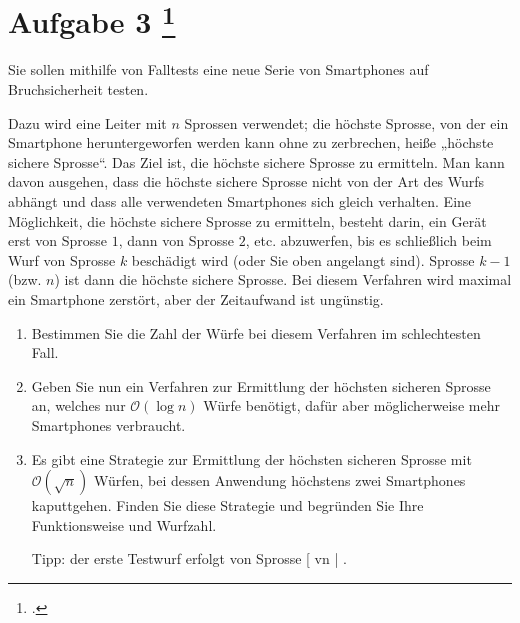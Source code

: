 \documentclass{lehramt-informatik-aufgabe}
\begin{document}
\section{Aufgabe 3
\footcite{46116:2016:03}}

Sie sollen mithilfe von Falltests eine neue Serie von Smartphones auf
Bruchsicherheit testen.

Dazu wird eine Leiter mit $n$ Sprossen verwendet; die höchste Sprosse,
von der ein Smartphone heruntergeworfen werden kann ohne zu zerbrechen,
heiße „höchste sichere Sprosse“. Das Ziel ist, die höchste sichere
Sprosse zu ermitteln. Man kann davon ausgehen, dass die höchste sichere
Sprosse nicht von der Art des Wurfs abhängt und dass alle verwendeten
Smartphones sich gleich verhalten. Eine Möglichkeit, die höchste sichere
Sprosse zu ermitteln, besteht darin, ein Gerät erst von Sprosse $1$,
dann von Sprosse $2$, etc. abzuwerfen, bis es schließlich beim Wurf von
Sprosse $k$ beschädigt wird (oder Sie oben angelangt sind). Sprosse $k -
1$ (bzw. $n$) ist dann die höchste sichere Sprosse. Bei diesem Verfahren
wird maximal ein Smartphone zerstört, aber der Zeitaufwand ist
ungünstig.

\begin{enumerate}

\item Bestimmen Sie die Zahl der Würfe bei diesem Verfahren im
schlechtesten Fall.

\item Geben Sie nun ein Verfahren zur Ermittlung der höchsten sicheren
Sprosse an, welches nur $\mathcal{O} (\log n)$ Würfe benötigt, dafür
aber möglicherweise mehr Smartphones verbraucht.


\item Es gibt eine Strategie zur Ermittlung der höchsten sicheren
Sprosse mit $\mathcal{O}(\sqrt{n})$ Würfen, bei dessen Anwendung
höchstens zwei Smartphones kaputtgehen. Finden Sie diese Strategie und
begründen Sie Ihre Funktionsweise und Wurfzahl.

Tipp: der erste Testwurf erfolgt von Sprosse [ vn | .

\end{enumerate}
\end{document}
